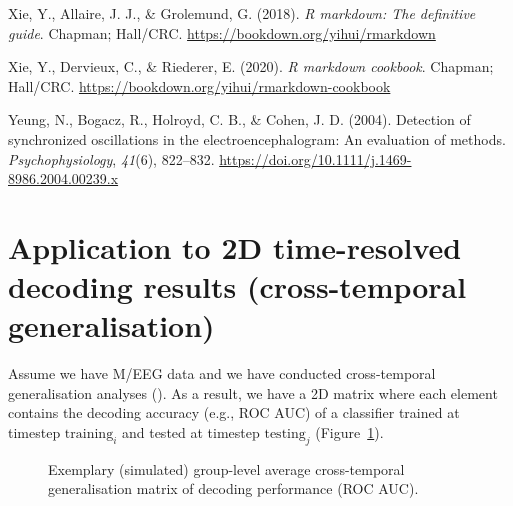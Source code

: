 \documentclass[
  doc,
  floatsintext,
  longtable,
  a4paper,
  nolmodern,
  notxfonts,
  notimes,
  donotrepeattitle,
  colorlinks=true,linkcolor=blue,citecolor=blue,urlcolor=blue]{apa7}
\newlength{\cslhangindent}
\newenvironment{CSLReferences}[2] %
 {\begin{list}{}{%
  \setlength{\itemindent}{0pt}
  \setlength{\leftmargin}{0pt}
  \setlength{\parsep}{0pt}
  \ifodd #1
   \setlength{\leftmargin}{\cslhangindent}
   \setlength{\itemindent}{-1\cslhangindent}
  \fi
  \setlength{\itemsep}{#2\baselineskip}}}
 {\end{list}}
\begin{document}
\begin{CSLReferences}{1}{0}
Xie, Y., Allaire, J. J., \& Grolemund, G. (2018). \emph{R markdown: The
definitive guide}. Chapman; Hall/CRC.
\url{https://bookdown.org/yihui/rmarkdown}

Xie, Y., Dervieux, C., \& Riederer, E. (2020). \emph{R markdown
cookbook}. Chapman; Hall/CRC.
\url{https://bookdown.org/yihui/rmarkdown-cookbook}

Yeung, N., Bogacz, R., Holroyd, C. B., \& Cohen, J. D. (2004). Detection
of synchronized oscillations in the electroencephalogram: An evaluation
of methods. \emph{Psychophysiology}, \emph{41}(6), 822--832.
\url{https://doi.org/10.1111/j.1469-8986.2004.00239.x}

\end{CSLReferences}

\newpage

\appendix

\section{Application to 2D time-resolved decoding results
(cross-temporal generalisation)}\label{sec-2D}

Assume we have M/EEG data and we have conducted cross-temporal
generalisation analyses (). As a result, we have a 2D matrix where each element contains the
decoding accuracy (e.g., ROC AUC) of a classifier trained at timestep
\(\text{training}_{i}\) and tested at timestep \(\text{testing}_{j}\)
(Figure~\ref{fig-sim-timegen}).

\begin{figure}[!htb]

\caption{\label{fig-sim-timegen}Exemplary (simulated) group-level
average cross-temporal generalisation matrix of decoding performance
(ROC AUC).}


\end{figure}%
\end{document}
